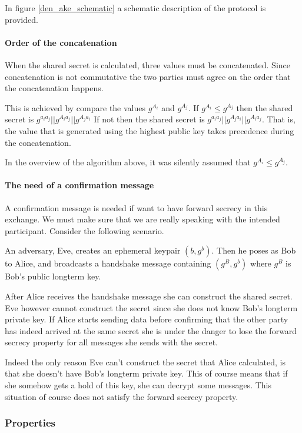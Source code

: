 In figure \ref{den_ake_schematic} a schematic description of the protocol is provided.

\paragraph{Order of the concatenation}
When the shared secret is calculated, three values must be concatenated. Since
concatenation is not commutative the two parties must agree on the order that the
concatenation happens.

This is achieved by compare the values $g^{A_i}$ and $g^{A_j}$. If
$g^{A_i} \le g^{A_j}$ then the shared secret is $g^{a_ia_j} || g^{A_ia_j} || g^{A_ja_i}$
If not then the shared secret is $g^{a_ia_j} || g^{A_ja_i} || g^{A_ia_j}$. That is, the
value that is generated using the highest public key takes precedence during the
concatenation.

In the overview of the algorithm above, it was silently assumed that
$g^{A_i} \le g^{A_j}$.

\paragraph{The need of a confirmation message}
\label{confirm_message_explain}
A confirmation message is needed if want to have forward secrecy in this exchange.
We must make sure that we are really speaking with the intended participant. Consider
the following scenario.

An adversary, Eve, creates an ephemeral keypair $(b, g^b)$. Then he poses as Bob to Alice,
and broadcasts a handshake message containing $(g^B,g^b)$ where $g^B$ is Bob's
public longterm key.

After Alice receives the handshake message she can construct the shared secret. Eve
however cannot construct the secret since she does not know Bob's longterm
private key. If Alice starts sending data before confirming that the other party
has indeed arrived at the same secret she is under the danger to lose the forward
secrecy property for all messages she sends with the secret.

Indeed the only reason Eve can't construct the secret that Alice calculated, is
that she doesn't have Bob's longterm private key. This of course means that if
she somehow gets a hold of this key, she can decrypt some messages. This situation
of course does not satisfy the forward secrecy property.


\subsubsection{Properties}

